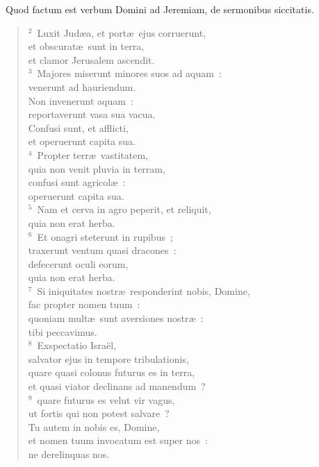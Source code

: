 ~Quod factum est verbum Domini ad Jeremiam, de sermonibus siccitatis.
\begin{flushleft}\begin{verse}\vspace{6pt}${}^{2}$~Luxit Jud\ae a, et port\ae\ ejus corruerunt,\\ et obscurat\ae\ sunt in terra,\\ et clamor Jerusalem ascendit.\\
${}^{3}$~Majores miserunt minores suos ad aquam~:\\ venerunt ad hauriendum.\\ Non invenerunt aquam~:\\ reportaverunt vasa sua vacua.\\ Confusi sunt, et afflicti,\\ et operuerunt capita sua.\\
${}^{4}$~Propter terr\ae\ vastitatem,\\ quia non venit pluvia in terram,\\ confusi sunt agricol\ae~:\\ operuerunt capita sua.\\
${}^{5}$~Nam et cerva in agro peperit, et reliquit,\\ quia non erat herba.\\
${}^{6}$~Et onagri steterunt in rupibus~;\\ traxerunt ventum quasi dracones~:\\ defecerunt oculi eorum,\\ quia non erat herba.\\
${}^{7}$~Si iniquitates nostr\ae\ responderint nobis, Domine,\\ fac propter nomen tuum~:\\ quoniam mult\ae\ sunt aversiones nostr\ae~:\\ tibi peccavimus.\\
${}^{8}$~Exspectatio Isra\"el,\\ salvator ejus in tempore tribulationis,\\ quare quasi colonus futurus es in terra,\\ et quasi viator declinans ad manendum~?\\
${}^{9}$~quare futurus es velut vir vagus,\\ ut fortis qui non potest salvare~?\\ Tu autem in nobis es, Domine,\\ et nomen tuum invocatum est super nos~:\\ ne derelinquas nos.\\

\end{verse}
\end{flushleft}
